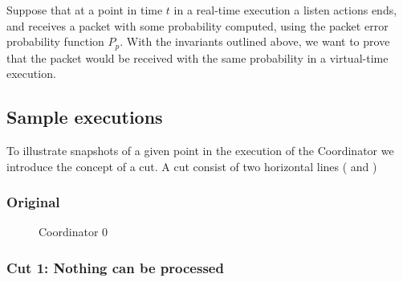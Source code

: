 Suppose that at a point in time $t$ in a real-time execution a listen actions ends, and receives a packet with some probability computed, using the packet error probability function $P_p$. With the invariants outlined above, we want to prove that the packet would be received with the same probability in a virtual-time execution.


\subsection{Sample executions}


To illustrate snapshots of a given point in the execution of the Coordinator we introduce the concept of a cut. A cut consist of two horizontal lines ( and )

\subsubsection{Original}

\begin{figure}[H]
    \centering
    \CoordinatorFigure{%

    }

    \caption{Coordinator 0}\label{tikz:coordinatormsc0}
\end{figure}

\subsubsection{Cut 1: Nothing can be processed}

